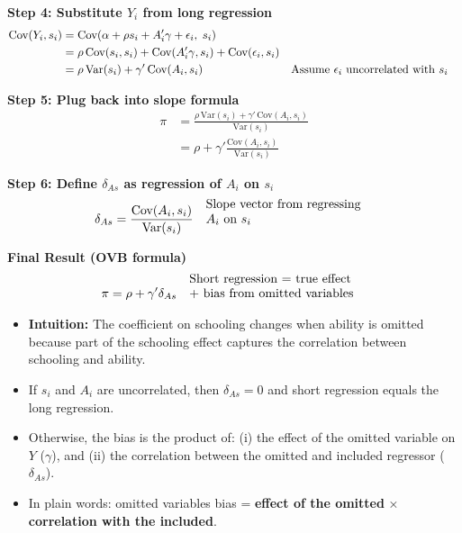 \documentclass[12pt]{article}
\begin{document}
\vspace{1em}
\noindent \textbf{Step 4: Substitute $Y_i$ from long regression}  
\begin{align}
\text{Cov}(Y_i, s_i) 
   &= \text{Cov}(\alpha + \rho s_i + A_i'\gamma + \epsilon_i, \; s_i) \\
   &= \rho \,\text{Cov}(s_i, s_i) + \text{Cov}(A_i'\gamma, s_i) + \text{Cov}(\epsilon_i, s_i) \\
   &= \rho \,\text{Var}(s_i) + \gamma'\,\text{Cov}(A_i, s_i) && \text{\shortstack[l]{Assume $\epsilon_i$ uncorrelated with $s_i$}}
\end{align}

\vspace{1em}
\noindent \textbf{Step 5: Plug back into slope formula}  
\begin{align}
\pi &= \frac{\rho \,\text{Var}(s_i) + \gamma'\,\text{Cov}(A_i, s_i)}{\text{Var}(s_i)} \\
    &= \rho + \gamma' \frac{\text{Cov}(A_i, s_i)}{\text{Var}(s_i)} 
\end{align}

\vspace{1em}
\noindent \textbf{Step 6: Define $\delta_{As}$ as regression of $A_i$ on $s_i$}  
\begin{align}
\delta_{As} &= \frac{\text{Cov}(A_i, s_i)}{\text{Var}(s_i)} && \text{\shortstack[l]{Slope vector from regressing \\ $A_i$ on $s_i$}}
\end{align}

\vspace{1em}
\noindent \textbf{Final Result (OVB formula)}  
\begin{align}
\pi &= \rho + \gamma' \delta_{As} && \text{\shortstack[l]{Short regression = true effect \\ + bias from omitted variables}}
\end{align}

\begin{itemize}
    \item \textbf{Intuition:} The coefficient on schooling changes when ability is omitted because part of the schooling effect captures the correlation between schooling and ability.  
    \item If $s_i$ and $A_i$ are uncorrelated, then $\delta_{As}=0$ and short regression equals the long regression.  
    \item Otherwise, the bias is the product of:  
        (i) the effect of the omitted variable on $Y$ ($\gamma$), and  
        (ii) the correlation between the omitted and included regressor ($\delta_{As}$).  
    \item In plain words: omitted variables bias = \textbf{effect of the omitted} × \textbf{correlation with the included}.
\end{itemize}
\end{document}
